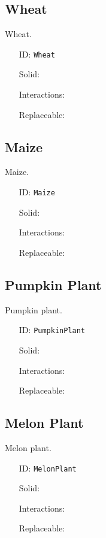 \subsection{Wheat}\label{subsec:blocks_wheat}
Wheat.
\newline
\begin{itemize}[nosep]
    \item[ID:] \texttt{Wheat}
    \item[Solid:]  \XSolidBrush \item[Interactions:]  \XSolidBrush \item[Replaceable:]  \XSolidBrush
\end{itemize}

\subsection{Maize}\label{subsec:blocks_maize}
Maize.
\newline
\begin{itemize}[nosep]
    \item[ID:] \texttt{Maize}
    \item[Solid:]  \XSolidBrush \item[Interactions:]  \XSolidBrush \item[Replaceable:]  \XSolidBrush
\end{itemize}

\subsection{Pumpkin Plant}\label{subsec:blocks_pumpkin plant}
Pumpkin plant.
\newline
\begin{itemize}[nosep]
    \item[ID:] \texttt{PumpkinPlant}
    \item[Solid:]  \XSolidBrush \item[Interactions:]  \XSolidBrush \item[Replaceable:]  \XSolidBrush
\end{itemize}

\subsection{Melon Plant}\label{subsec:blocks_melon plant}
Melon plant.
\newline
\begin{itemize}[nosep]
    \item[ID:] \texttt{MelonPlant}
    \item[Solid:]  \XSolidBrush \item[Interactions:]  \XSolidBrush \item[Replaceable:]  \XSolidBrush
\end{itemize}

